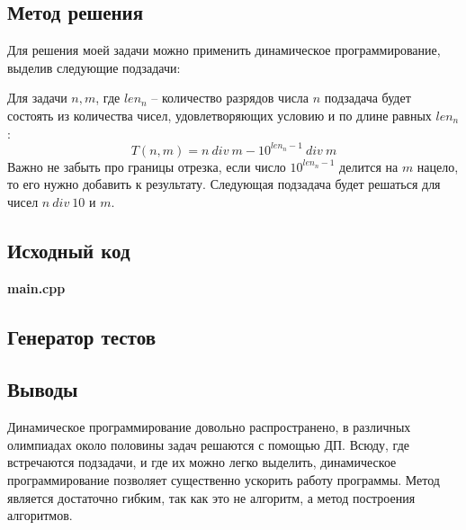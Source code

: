 \documentclass[12pt]{article}
\newcommand{\print}[1]{{\large  \bf  #1} {\scriptsize }}
\begin{document}
\subsection*{Метод решения}

Для решения моей задачи можно применить динамическое программирование, выделив следующие подзадачи:

Для задачи $n, m$, где $len_n$ -- количество разрядов числа $n$ подзадача будет состоять из количества чисел, удовлетворяющих условию  и по длине равных $len_n$ : $$T(n,m) = n~div~m - 10^{len_n-1}~div~m$$ Важно не забыть про границы отрезка, если число  $10^{len_n-1}$ делится на $m$ нацело, то его нужно добавить к результату. Следующая подзадача будет решаться для чисел $n~div~10$ и $m$.

\subsection*{Исходный код}


\print{main.cpp}

\subsection*{Генератор тестов}


\subsection*{Выводы}

Динамическое программирование довольно распространено, в различных олимпиадах около половины задач решаются с помощью ДП. Всюду, где встречаются подзадачи, и где их можно легко выделить, динамическое программирование позволяет существенно ускорить работу программы. Метод является достаточно гибким, так как это не алгоритм, а метод построения алгоритмов.
\end{document}
